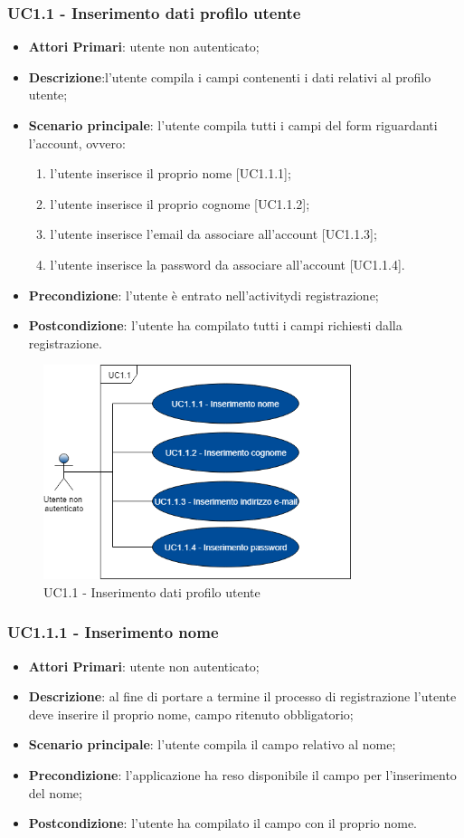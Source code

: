 \subsubsection{UC1.1 - Inserimento dati profilo utente}
\begin{itemize}
	\item \textbf{Attori Primari}: utente non autenticato;
	\item \textbf{Descrizione}:l'utente compila i campi contenenti i dati relativi al profilo utente;
	\item \textbf{Scenario principale}: l'utente compila tutti i campi del form riguardanti l'account, ovvero:
		\begin{enumerate}
			\item l'utente inserisce il proprio nome [UC1.1.1];
			\item l'utente inserisce il proprio cognome [UC1.1.2];
			\item l'utente inserisce l'email da associare all'account [UC1.1.3];
			\item l'utente inserisce la password da associare all'account [UC1.1.4].
		\end{enumerate}
	\item \textbf{Precondizione}: l'utente è entrato nell'activity\glosp di registrazione;
	\item \textbf{Postcondizione}: l'utente ha compilato tutti i campi richiesti dalla registrazione.
\end{itemize}
\begin{figure}[h]
	\includegraphics[width=9cm]{res/images/UC1-1Inserimento.png}
	\centering
	\caption{UC1.1 - Inserimento dati profilo utente}
\end{figure}
\newpage
\subsubsection{UC1.1.1 - Inserimento nome}
\begin{itemize}
	\item \textbf{Attori Primari}: utente non autenticato;
	\item \textbf{Descrizione}: al fine di portare a termine il processo di registrazione l'utente deve inserire il proprio nome, campo ritenuto obbligatorio;
	\item \textbf{Scenario principale}: l'utente compila il campo relativo al nome;	
	\item \textbf{Precondizione}: l'applicazione ha reso disponibile il campo per l'inserimento del nome;
	\item \textbf{Postcondizione}: l'utente ha compilato il campo con il proprio nome.	
\end{itemize}
